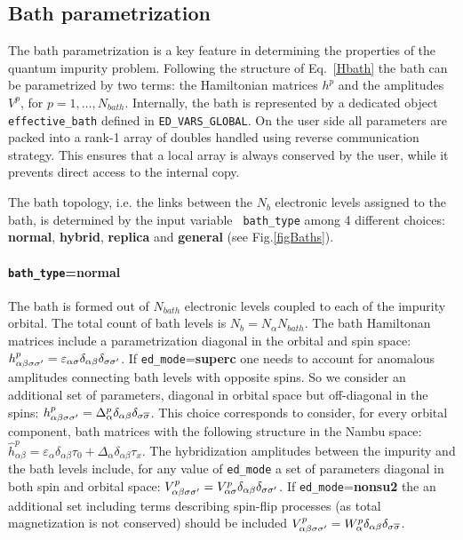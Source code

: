 \documentclass[preprint,3p,10pt]{elsarticle}
\def\a{\alpha}       \def\b{\beta}   \def\g{\gamma}   \def\d{\delta}
\def\e{\varepsilon}  \def\z{\zeta}   \def\h{\eta}     \def\th{\theta}
\begin{document}
\subsection{Bath parametrization}\label{sSecBath}
The bath parametrization is a key feature in determining the properties
of the quantum impurity problem.
Following the structure of Eq.~\ref{Hbath} the bath can be
parametrized by two terms: the Hamiltonian matrices $h^p$ and the
amplitudes $V^p$, for $p=1,\dots,N_{bath}$.
Internally, the bath is represented by a dedicated object {\tt
  effective\_bath} defined in {\tt ED\_VARS\_GLOBAL}. 
On the
user side all parameters are packed into a rank-1 array of
doubles handled using reverse communication strategy.
This ensures that a local array is always conserved by the user, while
it prevents direct access to the internal copy.


The bath topology, i.e. the links between the $N_b$ electronic levels
assigned to the bath, is determined by the input variable {\tt
  bath\_type} among 4 different choices: {\bf normal}, {\bf hybrid},
{\bf replica} and {\bf general} (see Fig.\ref{figBaths}).  
%
\paragraph{{\tt bath\_type}={\bf normal}} The bath is formed out of $N_{bath}$
electronic levels coupled to each of the impurity orbital. The total
count of bath levels is $N_b = N_\a N_{bath}$. The bath Hamiltonan
matrices include a parametrization diagonal in the orbital and spin space: 
$h^p_{\a\b\s\s'}=\varepsilon_{\a\s}\delta_{\a\b}\delta_{\s\s'}$.
If {\tt ed\_mode}={\bf superc} one needs to account for anomalous
amplitudes connecting bath levels with opposite spins. So we consider
an additional set of parameters, diagonal in orbital space but
off-diagonal in the spins:
$h^p_{\a\b\s\s'}=\Delta^p_{\a}\delta_{\a\b}\delta_{\s \overline{\s}}$.
This choice corresponds to consider, for every orbital component,
bath matrices with the following structure in the Nambu space:
$\hat{h}^p_{\a\b} = \e_{\a}\delta_{\a\b}\tau_0 +
\Delta_{\a}\delta_{\a\b}\tau_x$. 
The hybridization amplitudes between the impurity and the bath levels
include, for any value of {\tt ed\_mode} a set of parameters diagonal in both
spin and orbital space: $V^p_{\a\b\s\s'}=V^p_{\a\s}\delta_{\a\b}\delta_{\s\s'}$.
If {\tt ed\_mode}={\bf nonsu2} the an additional set including terms
describing spin-flip processes (as total magnetization is not
conserved) should be included $V^p_{\a\b\s\s'} =
W^p_{\a}\delta_{\a\b}\delta_{\s \overline{\s}}$. 
\end{document}
